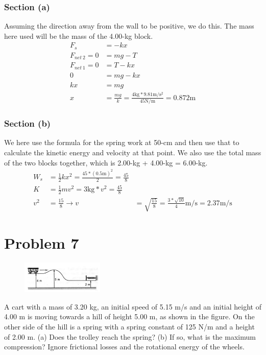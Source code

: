 \documentclass[12pt]{article}
\begin{document}
\subsubsection*{Section (a)}
Assuming the direction away from the wall to be positive, we do this. The mass here used will be the mass of the 4.00-kg block. 
\begin{align*}
    F_s &= -kx\\
    F_{net\ 2} = 0 &= mg - T\\
    F_{net\ 1} = 0 &= T - kx\\
    0   &=  mg - kx\\
    kx  &=  mg\\
    x   &=  \frac{mg}{k} = \frac{4\unit{\kilo\gram}*9.81\unit{\meter/\second^2}}{45\unit{\newton/\meter}} = \boxed{0.872\unit{\meter}}
\end{align*}

\subsubsection*{Section (b)}
We here use the formula for the spring work at 50-cm and then use that to calculate the kinetic energy and velocity at that point. We also use the total mass of the two blocks together, which is 2.00-kg + 4.00-kg = 6.00-kg.
\begin{align*}
    W_s &=  \frac{1}{2} kx^2 = \frac{45*(0.5\unit{\meter})^2}{2} = \frac{45}{8}\\
    K   &=  \frac{1}{2}mv^2 = 3\unit{\kilo\gram}*v^2 = \frac{45}{8}\\
    v^2 &=  \frac{15}{8}\rightarrow
    v   &=  \sqrt{\frac{15}{8}} = \boxed{\frac{3*\sqrt{10}}{4} \unit{\meter/\second} = 2.37 \unit{\meter/\second}}
\end{align*}

\pagebreak
\section*{Problem 7}
\begin{figure}
    \vspace{-30pt}
    \includegraphics[width=0.35\textwidth]{graph_7.png} 
\end{figure}
A cart with a mass of 3.20 kg, an initial speed of 5.15 m/s and an initial height of 4.00 m is moving towards a hill of height 5.00 m, as shown in the figure. On the other side of the hill is a spring with a spring constant of 125 N/m and a height of 2.00 m. (a) Does the trolley reach the spring? (b) If so, what is the maximum compression? Ignore frictional losses and the rotational energy of the wheels.
\end{document}
